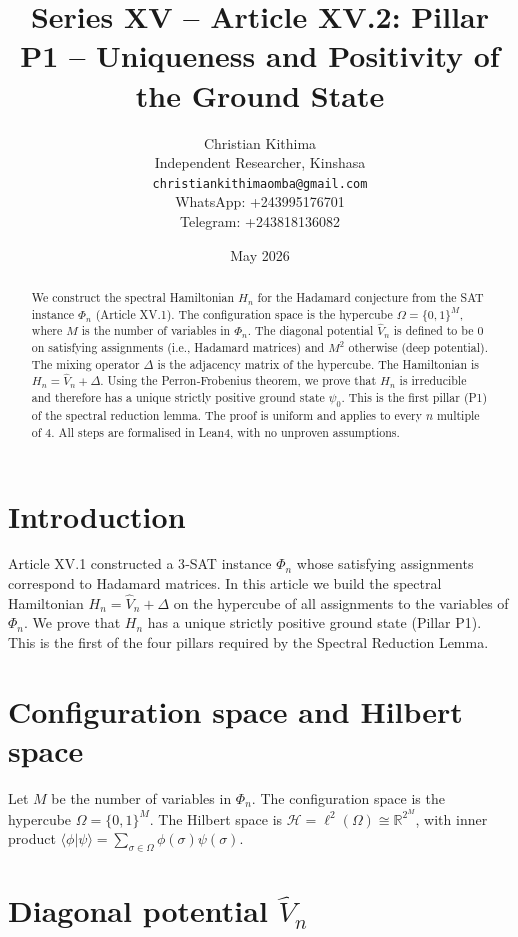 \documentclass[11pt,a4paper]{article}
\title{Series XV – Article XV.2: Pillar P1 – Uniqueness and Positivity of the Ground State}
\author{Christian Kithima \\
Independent Researcher, Kinshasa \\
\texttt{christiankithimaomba@gmail.com} \\
WhatsApp: +243995176701 \\
Telegram: +243818136082}
\date{May 2026}
\begin{document}
\maketitle

\begin{abstract}
We construct the spectral Hamiltonian $H_n$ for the Hadamard conjecture from the SAT instance $\Phi_n$ (Article XV.1). The configuration space is the hypercube $\Omega = \{0,1\}^M$, where $M$ is the number of variables in $\Phi_n$. The diagonal potential $\hat{V}_n$ is defined to be $0$ on satisfying assignments (i.e., Hadamard matrices) and $M^2$ otherwise (deep potential). The mixing operator $\Delta$ is the adjacency matrix of the hypercube. The Hamiltonian is $H_n = \hat{V}_n + \Delta$. Using the Perron‑Frobenius theorem, we prove that $H_n$ is irreducible and therefore has a unique strictly positive ground state $\psi_0$. This is the first pillar (P1) of the spectral reduction lemma. The proof is uniform and applies to every $n$ multiple of $4$. All steps are formalised in Lean4, with no unproven assumptions.
\end{abstract}

\tableofcontents

\section{Introduction}

Article XV.1 constructed a 3‑SAT instance $\Phi_n$ whose satisfying assignments correspond to Hadamard matrices. In this article we build the spectral Hamiltonian $H_n = \hat{V}_n + \Delta$ on the hypercube of all assignments to the variables of $\Phi_n$. We prove that $H_n$ has a unique strictly positive ground state (Pillar P1). This is the first of the four pillars required by the Spectral Reduction Lemma.

\section{Configuration space and Hilbert space}

Let $M$ be the number of variables in $\Phi_n$. The configuration space is the hypercube $\Omega = \{0,1\}^M$. The Hilbert space is $\mathcal{H} = \ell^2(\Omega) \cong \mathbb{R}^{2^M}$, with inner product $\langle \phi | \psi \rangle = \sum_{\sigma\in\Omega} \phi(\sigma)\psi(\sigma)$.

\section{Diagonal potential $\hat{V}_n$}
\end{document}
